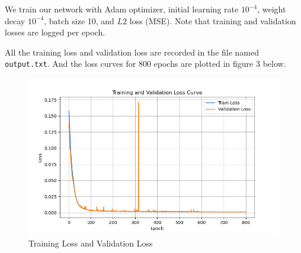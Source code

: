 \documentclass{article}
\begin{document}
We train our network with Adam optimizer, initial learning rate $10^{-4}$, 
weight decay $10^{-4}$, batch size 10, and $L2$ loss (MSE). 
Note that training and validation losses are logged per epoch.

All the training loss and validation loss are recorded in the file named \texttt{output.txt}. 
And the loss curves for 800 epochs are plotted in figure 3 below.
\begin{figure}[ht]
  \centering
  \includegraphics[width=\linewidth]{../Training Loss and Validation Loss.png}
  \caption{Training Loss and Validation Loss}
\end{figure}
\end{document}
